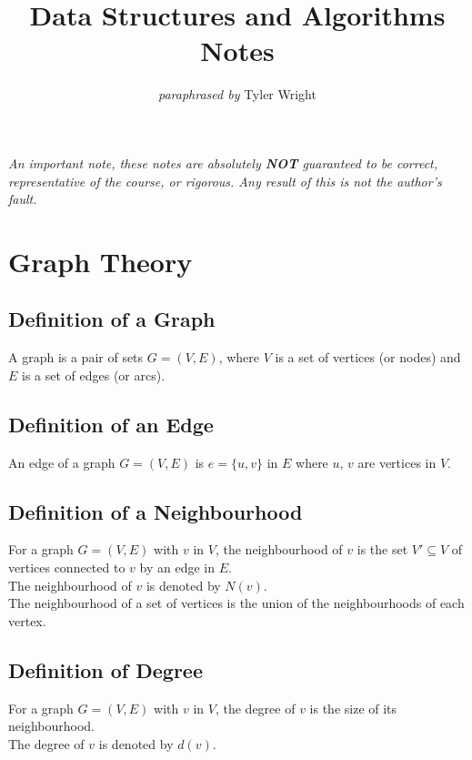 \documentclass[a4paper, 12pt, twoside]{article}
\begin{document}
\title{Data Structures and Algorithms Notes}
\date{}
\author{\textit{paraphrased by} Tyler Wright}
\maketitle

\vfill

\textit{An important note, these notes are absolutely \textbf{NOT}
  guaranteed to be correct, representative of the course, or rigorous.
  Any result of this is not the author's fault.}

\newpage

\section{Graph Theory}

\subsection{Definition of a Graph}

A graph is a pair of sets $G = (V, E)$, where $V$ is a set of 
vertices (or nodes) and $E$ is a set of edges (or arcs).

\subsection{Definition of an Edge}

An edge of a graph $G = (V, E)$ is $e = \{u, v\}$ in $E$ where $u$,
$v$ are vertices in $V$.

\subsection{Definition of a Neighbourhood}

For a graph $G = (V, E)$ with $v$ in $V$, the neighbourhood
of $v$ is the set $V' \subseteq V$ of vertices connected to
$v$ by an edge in $E$.
\\[\baselineskip]
The neighbourhood of $v$ is denoted by $N(v)$.
\\[\baselineskip]
The neighbourhood of a set of vertices is the union of
the neighbourhoods of each vertex.

\subsection{Definition of Degree}

For a graph $G = (V, E)$ with $v$ in $V$, the degree of $v$
is the size of its neighbourhood.
\\[\baselineskip]
The degree of $v$ is denoted by $d(v)$.
\end{document}
